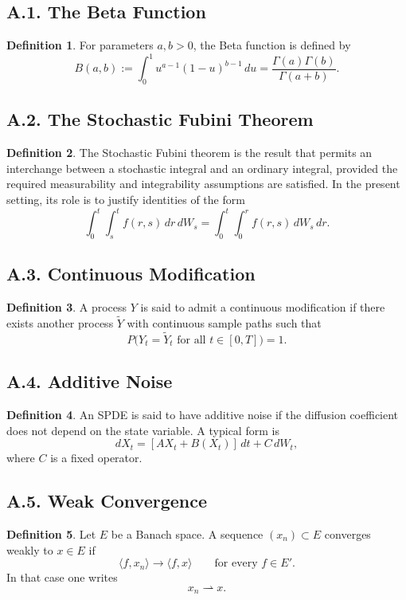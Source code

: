 \documentclass[11pt]{article}
\theoremstyle{definition}
\newtheorem{definition}{Definition}
\theoremstyle{remark}
\begin{document}
\subsection*{A.1. The Beta Function}
\begin{definition}
For parameters \(a,b>0\), the Beta function is defined by
\[
B(a,b):=\int_0^1 u^{a-1}(1-u)^{b-1}\,du
=
\frac{\Gamma(a)\Gamma(b)}{\Gamma(a+b)}.
\]
\end{definition}

\subsection*{A.2. The Stochastic Fubini Theorem}
\begin{definition}
The Stochastic Fubini theorem is the result that permits an interchange between a stochastic integral and an ordinary integral, provided the required measurability and integrability assumptions are satisfied. In the present setting, its role is to justify identities of the form
\[
\int_0^t\int_s^t f(r,s)\,dr\,dW_s
=
\int_0^t\int_0^r f(r,s)\,dW_s\,dr.
\]
\end{definition}

\subsection*{A.3. Continuous Modification}
\begin{definition}
A process \(Y\) is said to admit a continuous modification if there exists another process \(\widetilde Y\) with continuous sample paths such that
\[
P\bigl(Y_t=\widetilde Y_t \text{ for all } t\in[0,T]\bigr)=1.
\]
\end{definition}

\subsection*{A.4. Additive Noise}
\begin{definition}
An SPDE is said to have additive noise if the diffusion coefficient does not depend on the state variable. A typical form is
\[
dX_t=[AX_t+B(X_t)]\,dt+C\,dW_t,
\]
where \(C\) is a fixed operator.
\end{definition}

\subsection*{A.5. Weak Convergence}
\begin{definition}
Let \(E\) be a Banach space. A sequence \((x_n)\subset E\) converges weakly to \(x\in E\) if
\[
\langle f,x_n\rangle\to \langle f,x\rangle
\qquad \text{for every } f\in E'.
\]
In that case one writes
\[
x_n\rightharpoonup x.
\]
\end{definition}
\end{document}
